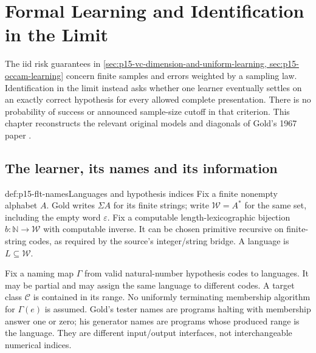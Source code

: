 \chapter{Formal Learning and Identification in the Limit}
\label{sec:p15-formal-identification}

The iid risk guarantees in \cref{sec:p15-vc-dimension-and-uniform-learning,
sec:p15-occam-learning} concern finite samples and errors weighted by
a sampling law. Identification in the limit instead asks whether one
learner eventually settles on an exactly correct hypothesis for every
allowed complete presentation. There is no probability of success
or announced sample-size cutoff in that criterion.
This chapter reconstructs the relevant original models and diagonals
of Gold's 1967 paper \cite{Gold1967IdentificationFLT}.

\section{The learner, its names and its information}
\label{sec:p15-flt-model}

\begin{hbdefinition}{def:p15-flt-names}{Languages and hypothesis indices}
Fix a finite nonempty alphabet \(A\).
Gold writes \(\Sigma A\) for its finite strings; write
\(\mathcal W=A^*\) for the same set, including the empty
word \(\varepsilon\). Fix a computable length-lexicographic
bijection \(b:\mathbb N\to\mathcal W\) with computable
inverse. It can be chosen primitive recursive on finite-string
codes, as required by the source's integer/string bridge.
A language is \(L\subseteq\mathcal W\).

Fix a naming map \(\Gamma\) from valid natural-number
hypothesis codes to languages. It may be partial and may
assign the same language to different codes.
A target class \(\mathcal C\) is contained in its range.
No uniformly terminating membership algorithm for
\(\Gamma(e)\) is assumed.
Gold's tester names are programs halting with membership
answer one or zero; his generator names are programs whose
produced range is the language. They are different input/output
interfaces, not interchangeable numerical indices.
\end{hbdefinition}

